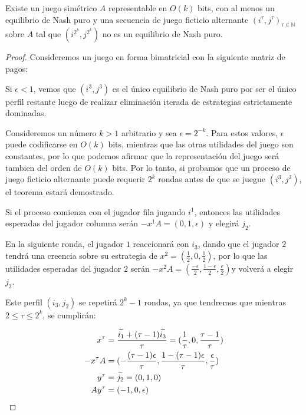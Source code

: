 \begin{theorem} \label{teorema:afp:velocidad:simetricos}
    Existe un juego simétrico $A$ representable en $O(k)$ bits, con al menos un equilibrio de Nash puro y una secuencia de juego ficticio alternante $(i^\tau, j^\tau)_{\tau \in \mathbb{N}}$ sobre $A$ tal que $(i^{2^k}, j^{2^k})$ no es un equilibrio de Nash puro.
\end{theorem}
\begin{proof}
    Consideremos un juego en forma bimatricial con la siguiente matriz de pagos:

    

    Si $\epsilon < 1$, vemos que $(i^3, j^3)$ es el único equilibrio de Nash puro por ser el único perfil restante luego de realizar eliminación iterada de estrategias estrictamente dominadas. 

    Consideremos un número $k > 1$ arbitrario y sea $\epsilon = 2^{-k}$. Para estos valores, $\epsilon$ puede codificarse en $O(k)$ bits, mientras que las otras utilidades del juego son constantes, por lo que podemos afirmar que la representación del juego será tambien del orden de  $O(k)$ bits. Por lo tanto, si probamos que un proceso de juego ficticio alternante puede requerir $2^k$ rondas antes de que se juegue $(i^3, j^3)$, el teorema estará demostrado.

    Si el proceso comienza con el jugador fila jugando $i^1$, entonces las utilidades esperadas del jugador columna serán $-x^1A = (0, 1, \epsilon)$ y elegirá $j_2$.

    En la siguiente ronda, el jugador $1$ reaccionará con $i_3$, dando que el jugador $2$ tendrá una creencia sobre su estrategia de $x^2 = (\frac{1}{2},0,\frac{1}{2})$, por lo que las utilidades esperadas del jugador $2$ serán $-x^2A = (\frac{-\epsilon}{2}, \frac{1-\epsilon}{2}, \frac{\epsilon}{2})$y volverá a elegir $j_2$.

    Este perfil $(i_3, j_2)$ se repetirá $2^k - 1$ rondas, ya que tendremos que mientras $2 \le \tau \le 2^k$, se cumplirán:

    \begin{align*}
        x^\tau     &= \frac{\widetilde{i_1} + (\tau - 1) \widetilde{i_3}}{\tau} = (\frac{1}{\tau}, 0,\frac{\tau - 1}{\tau}) \\
        -x^{\tau}A &= (-\frac{(\tau-1) \epsilon}{\tau}, \frac{1-(\tau-1)\epsilon}{\tau}, \frac{\epsilon}{\tau}) \\
        y^\tau     &= \widetilde{j_2} = (0, 1, 0) \\
        Ay^\tau    &= (- 1, 0, \epsilon) \\
    \end{align*}


\end{proof}
